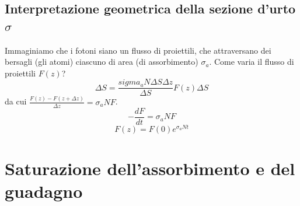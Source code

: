 \subsection{Interpretazione geometrica della sezione d'urto $\sigma$}
Immaginiamo che i fotoni siano un flusso di proiettili, che attraversano dei bersagli (gli atomi) ciascuno di area (di assorbimento) $\sigma_a$. Come varia il flusso di proiettili $F(z)$?
\begin{equation*}
[F(z) - F(z + \Delta z)] \Delta S = \frac{sigma_a N \Delta S \Delta z}{\Delta S} F(z) \Delta S
\end{equation*}
da cui $\frac{F(z) - F(z + \Delta z)}{\Delta z} = \sigma_a N F$.
\begin{equation*}
-\frac{dF}{dt} = \sigma_a N F
\end{equation*}
\begin{equation*}
F(z) = F(0) e^{\sigma_a N t}
\end{equation*}

\section{Saturazione dell'assorbimento e del guadagno}

